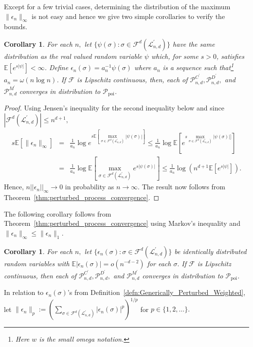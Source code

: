 \documentclass[12pt]{amsart}
\newcommand{\Exp}{\mathbb{E}}
\newcommand{\PoiP}{\mathscr{P}_{\text{poi}}}
\newcommand{\PoiFt}{\mathscr{P}_{n, d}^{C^\prime}}
\newcommand{\PoiMt}{\mathscr{P}_{n, d}^{M^\prime}}
\newcommand{\PoiDt}{\mathscr{P}_{n, d}^{D^\prime}}
\newcommand{\gt}[1]{\textcolor{blue}{#1}}
\renewcommand{\gt}[1]{#1}
\newtheorem{corollary}[theorem]{Corollary}
\numberwithin{equation}{section}
\numberwithin{theorem}{section}
\newcommand{\1}{\mathbf{1}}
\def\F{\mathcal{F}}
\def\sF{\mathscr{F}}
\def\Lp{\mathcal{L}^\prime}
\def\EP{\mathbb{E}}
\begin{document}
%	
Except for a few trivial cases, determining the distribution of the maximum $\|\epsilon_n\|_{\infty}$ is not easy and hence we give two simple corollaries to verify the bounds.
%	
\begin{corollary}
\label{cor:Simple_Cond}
For each $n,$ let $\{\psi(\sigma) : \sigma \in \F^d(\Lp_{n, d})\}$ have the same distribution as the real valued random variable $\psi$ which, for some $s > 0$, satisfies $\Exp[e^{s|\psi|}] < \infty$. Define $\epsilon_n(\sigma) = a_n^{-1} \psi(\sigma)$ where $a_n$ is a sequence such that\footnote{Here $w$ is the small omega notation.} $a_n = \omega(n\log n)$. If $\sF$ is \gt{Lipschitz continuous}, then, each of $\PoiFt, \PoiDt,$ and $\PoiMt$ converges in distribution to $\PoiP$.
\end{corollary}
%
\begin{proof}
Using Jensen's inequality for the second inequality below and since $|\F^d(\Lp_{n, d})| \leq n^{d + 1},$
%
\begin{eqnarray*}
s\Exp[\|\epsilon_n\|_{\infty}] & = & \frac{1}{a_{n}} \log e^{s \Exp \left[ \max_{\sigma \in \F^{d}(\Lp_{n, d})} |\psi(\sigma)|\right]}
\leq  \frac{1}{a_{n}} \log \Exp \left[e^{s \max_{\sigma \in \F^{d}(\Lp_{n, d})} |\psi(\sigma)|]}\right]\\
& = & \frac{1}{a_{n}} \log \Exp \left[\max_{\sigma \in \F^{d}(\Lp_{n, d})} e^{s |\psi(\sigma)|}\right] \leq \frac{1}{a_{n}} \log( n^{d + 1} \mathbb{E}[e^{s|\psi|}]).
\end{eqnarray*}
%
Hence, $n ||\epsilon_{n}||_{\infty} \to 0$ in probability as $n \to \infty.$ The result now follows from Theorem~\ref{thm:perturbed_process_convergence}.
\end{proof}
%
The following corollary follows from Theorem~\ref{thm:perturbed_process_convergence} using Markov's inequality and $\|\epsilon_n\|_{\infty}  \leq \|\epsilon_n\|_1$.
%
\begin{corollary}
\label{cor:Simple_Condition2}
For each $n,$ let $\{\epsilon_n(\sigma): \sigma \in \F^d(\Lp_{n, d})\}$ be identically distributed random variables with \gt{$\EP|\epsilon_n(\sigma)| = o(n^{- d - 2})$} for each $\sigma.$ If $\sF$ is \gt{Lipschitz continuous}, then each of $\PoiFt, \PoiDt,$ and $\PoiMt$ converges in distribution to $\PoiP$.
\end{corollary}

%

In relation to $\epsilon_n(\sigma)$'s from Definition~\ref{defn:Generically_Perturbed_Weighted}, let $\|\epsilon_n\|_p := (\sum_{\sigma \in \F^d(\Lp_{n, d})} |\epsilon_n(\sigma)|^p)^{1/p}$ for $p \in \{1,2,\ldots\}.$
\end{document}
